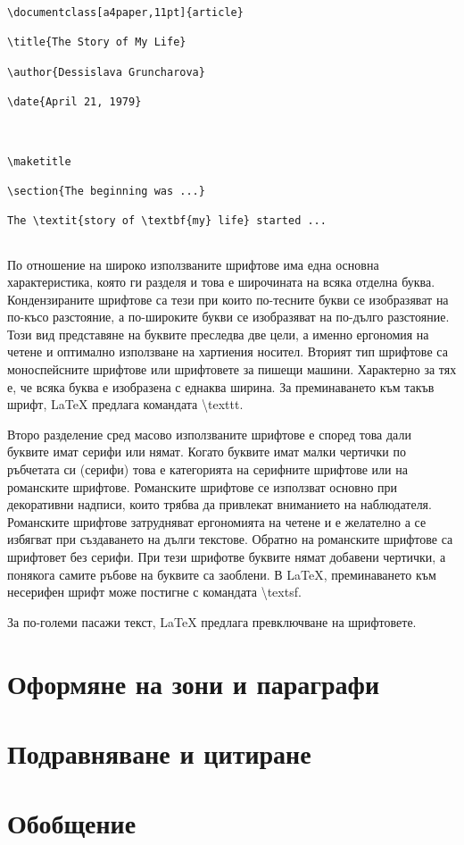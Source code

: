 \begin{lstlisting}[language={[LaTeX]TeX}, caption=Вложено оформление, label=listing-0008]
\documentclass[a4paper,11pt]{article}

\title{The Story of My Life}

\author{Dessislava Gruncharova}

\date{April 21, 1979}



\maketitle

\section{The beginning was ...}

The \textit{story of \textbf{my} life} started ...


\end{lstlisting}

По отношение на широко използваните шрифтове има една основна характеристика, която ги разделя и това е широчината на всяка отделна буква. Кондензираните шрифтове са тези при които по-тесните букви се изобразяват на по-късо разстояние, а по-широките букви се изобразяват на по-дълго разстояние. Този вид представяне на буквите преследва две цели, а именно ергономия на четене и оптимално използване на хартиения носител. Вторият тип шрифтове са моноспейсните шрифтове или шрифтовете за пишещи машини. Характерно за тях е, че всяка буква е изобразена с еднаква ширина. За преминаването към такъв шрифт, LaTeX предлага командата \textbackslash texttt. 

Второ разделение сред масово използваните шрифтове е според това дали буквите имат серифи или нямат. Когато буквите имат малки чертички по ръбчетата си (серифи) това е категорията на серифните шрифтове или на романските шрифтове. Романските шрифтове се използват основно при декоративни надписи, които трябва да привлекат вниманието на наблюдателя. Романските шрифтове затрудняват ергономията на четене и е желателно а се избягват при създаването на дълги текстове. Обратно на романските шрифтове са шрифтовет без серифи. При тези шрифотве буквите нямат добавени чертички, а понякога самите ръбове на буквите са заоблени. В LaTeX, преминаването към несерифен шрифт може постигне с командата \textbackslash textsf. 

За по-големи пасажи текст, LaTeX предлага превключване на шрифтовете. 

\section{Оформяне на зони и параграфи}



\section{Подравняване и цитиране}



\section*{Обобщение}



